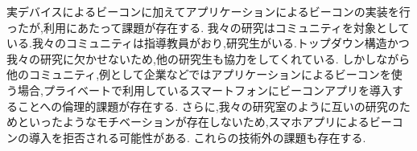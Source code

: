 実デバイスによるビーコンに加えてアプリケーションによるビーコンの実装を行ったが,利用にあたって課題が存在する.
我々の研究はコミュニティを対象としている.我々のコミュニティは指導教員がおり,研究生がいる.トップダウン構造かつ我々の研究に欠かせないため,他の研究生も協力をしてくれている.
しかしながら他のコミュニティ,例として企業などではアプリケーションによるビーコンを使う場合,プライベートで利用しているスマートフォンにビーコンアプリを導入することへの倫理的課題が存在する.
さらに,我々の研究室のように互いの研究のためといったようなモチベーションが存在しないため,スマホアプリによるビーコンの導入を拒否される可能性がある.
これらの技術外の課題も存在する.

